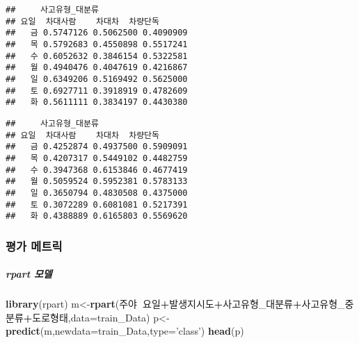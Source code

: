 \documentclass[]{article}
\newenvironment{Shaded}{\begin{snugshade}}{\end{snugshade}}
\newcommand{\KeywordTok}[1]{\textcolor[rgb]{0.13,0.29,0.53}{\textbf{#1}}}
\newcommand{\DataTypeTok}[1]{\textcolor[rgb]{0.13,0.29,0.53}{#1}}
\newcommand{\StringTok}[1]{\textcolor[rgb]{0.31,0.60,0.02}{#1}}
\newcommand{\OperatorTok}[1]{\textcolor[rgb]{0.81,0.36,0.00}{\textbf{#1}}}
\newcommand{\NormalTok}[1]{#1}
\let\oldsubparagraph\subparagraph
\renewcommand{\subparagraph}[1]{\oldsubparagraph{#1}\mbox{}}
\begin{document}
\begin{verbatim}
##     사고유형_대분류
## 요일  차대사람    차대차  차량단독
##   금 0.5747126 0.5062500 0.4090909
##   목 0.5792683 0.4550898 0.5517241
##   수 0.6052632 0.3846154 0.5322581
##   월 0.4940476 0.4047619 0.4216867
##   일 0.6349206 0.5169492 0.5625000
##   토 0.6927711 0.3918919 0.4782609
##   화 0.5611111 0.3834197 0.4430380
\end{verbatim}

\begin{Shaded}
\end{Shaded}

\begin{verbatim}
##     사고유형_대분류
## 요일  차대사람    차대차  차량단독
##   금 0.4252874 0.4937500 0.5909091
##   목 0.4207317 0.5449102 0.4482759
##   수 0.3947368 0.6153846 0.4677419
##   월 0.5059524 0.5952381 0.5783133
##   일 0.3650794 0.4830508 0.4375000
##   토 0.3072289 0.6081081 0.5217391
##   화 0.4388889 0.6165803 0.5569620
\end{verbatim}

\subsubsection{평가 메트릭}\label{-}

\subparagraph{rpart 모델}\label{rpart-}

\begin{Shaded}
\begin{Highlighting}[]
\KeywordTok{library}\NormalTok{(rpart)}
\NormalTok{m<-}\KeywordTok{rpart}\NormalTok{(주야}\OperatorTok{~}\NormalTok{요일}\OperatorTok{+}\NormalTok{발생지시도}\OperatorTok{+}\NormalTok{사고유형_대분류}\OperatorTok{+}\NormalTok{사고유형_중분류}\OperatorTok{+}\NormalTok{도로형태,}\DataTypeTok{data=}\NormalTok{train_Data)}
\NormalTok{p<-}\KeywordTok{predict}\NormalTok{(m,}\DataTypeTok{newdata=}\NormalTok{train_Data,}\DataTypeTok{type=}\StringTok{'class'}\NormalTok{)}
\KeywordTok{head}\NormalTok{(p)}
\end{Highlighting}
\end{Shaded}
\end{document}
